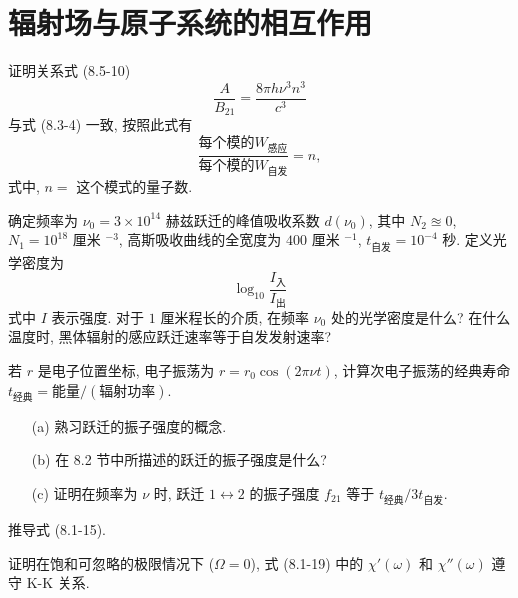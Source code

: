 \documentclass{note}
\begin{document}
\setcounter{chapter}{8}
\fi
\chapter{辐射场与原子系统的相互作用}
\begin{exe}
    证明关系式 (8.5-10)
    \[
        \frac{A}{B_{21}}=\frac{8\pi h\nu^3n^3}{c^3}
    \]
    与式 (8.3-4) 一致, 按照此式有
    \[
        \frac{\text{每个模的}W_{\text{感应}}}{\text{每个模的}W_{\text{自发}}}=n,
    \]
    式中, $n=$ 这个模式的量子数.
\end{exe}
\begin{pf}
    
\end{pf}

\begin{exe}
    确定频率为 $\nu_0=3\times 10^{14}$ 赫兹跃迁的峰值吸收系数 $d(\nu_0)$, 其中 $N_2\approxeq 0$, $N_1=10^{18}$ 厘米 ${}^{-3}$, 高斯吸收曲线的全宽度为 $400$ 厘米 ${}^{-1}$, $t_{\text{自发}}=10^{-4}$ 秒. 定义光学密度为
    \[
        \log_{10}\frac{I_{\text{入}}}{I_{\text{出}}}
    \]
    式中 $I$ 表示强度. 对于 $1$ 厘米程长的介质, 在频率 $\nu_0$ 处的光学密度是什么? 在什么温度时, 黑体辐射的感应跃迁速率等于自发发射速率?
\end{exe}
\begin{sol}

\end{sol}

\begin{exe}
    若 $r$ 是电子位置坐标, 电子振荡为 $r=r_0\cos(2\pi\nu t)$, 计算次电子振荡的经典寿命 $t_{\text{经典}}=\text{能量}/(\text{辐射功率})$.
\end{exe}
\begin{sol}
    
\end{sol}

\begin{exe}
    \begin{itemize}
        \item[(a)] 熟习跃迁的振子强度的概念.
        \item[(b)] 在 8.2 节中所描述的跃迁的振子强度是什么?
        \item[(c)] 证明在频率为 $\nu$ 时, 跃迁 $1\leftrightarrow 2$ 的振子强度 $f_{21}$ 等于 $t_{\text{经典}}/3t_{\text{自发}}$.
    \end{itemize}
\end{exe}
\begin{sol}
    
\end{sol}

\begin{exe}
    推导式 (8.1-15).
\end{exe}
\begin{pf}
    
\end{pf}

\begin{exe}
    证明在饱和可忽略的极限情况下 ($\Omega=0$), 式 (8.1-19) 中的 $\chi'(\omega)$ 和 $\chi''(\omega)$ 遵守 K-K 关系.
\end{exe}
\begin{pf}
    
\end{pf}
\ifx\allfiles\undefined
\end{document}
